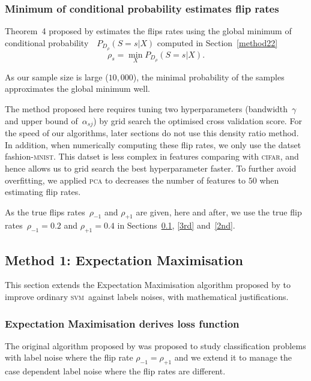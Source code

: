 \documentclass[12pt]{article} %
\newcommand{\svm}{\textsc{svm}}
\newcommand{\rhoo}{\rho_{+1}}
\newcommand{\rhoz}{\rho_{-1}}
\newcommand{\mnist}{fashion-\textsc{mnist}}
\begin{document}
\subsubsection{Minimum of conditional probability estimates flip rates}\label{method23}
Theorem~4 proposed by \citet{liu2016classification} estimates the flips rates using the global minimum of conditional probability~~$P_{D_\rho}(S=s|X)$ computed in Section~\ref{method22}
\begin{equation*}\label{eq:fliprate}
\rho_s=\min _X P_{D_\rho}(S=s|X).
\end{equation*}

As our sample size is large ($10,000$), the minimal probability of the samples approximates the global minimum well.

The method proposed here requires tuning two hyperparameters (bandwidth~$\gamma$ and upper bound of~$\alpha_{sj}$) by grid search the optimised cross validation score. For the speed of our algorithms, later sections do not use this density ratio method.
In addition, when numerically computing these flip rates, we only use the datset \mnist. This datset is less complex in features comparing with \textsc{cifar}, and hence allows us to grid search the best hyperparameter faster. To further avoid overfitting, we applied \textsc{pca} to decreases the number of features to $50$ when estimating flip rates.

As the true flips rates~$\rhoz$ and $\rhoo$ are given, here and after, we use the true flip rates~$\rhoz=0.2$ and $\rhoo=0.4$ in Sections~\ref{1st}, \ref{3rd} and~\ref{2nd}.


\subsection{Method 1: Expectation Maximisation}\label{1st}
This section extends the Expectation Maximisation algorithm proposed by \citet{pmlr-v20-biggio11} to improve ordinary \svm\ against labels noises, with mathematical justifications.
\subsubsection{Expectation Maximisation derives loss function}
The original algorithm proposed by \citet{pmlr-v20-biggio11} was proposed to study classification problems with label noise where the flip rate $\rhoz=\rhoo$ and we extend it to manage the case dependent label noise where the flip rates are different.
\end{document}
